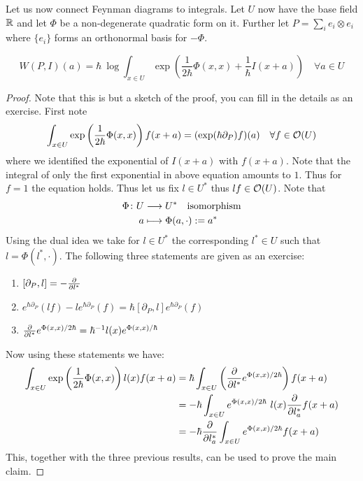 Let us now connect Feynman diagrams to integrals. Let $U$ now have the base field $\mathbb{R}$ and let $\Phi$ be a non-degenerate quadratic form on it. Further let $P = \sum_i e_i \otimes e_i$ where $\{e_i\}$ forms an orthonormal basis for $- \Phi$.

\begin{prop}
  $$ W(P,I)(a) = \hbar \ \log \int_{x \in U} \exp\left( \frac{1}{2\hbar} \Phi(x,x) + \frac{1}{\hbar} I(x+a) \right) \quad \forall a \in U $$
\begin{proof}
  Note that this is but a sketch of the proof, you can fill in the details as an exercise. First note
  $$ \int_{x \in U} \exp\left( \frac{1}{2\hbar} \Phi(x,x) \right) f(x+a) = (\exp(\hbar \partial_P) f) (a) \quad \forall f \in \mathcal{O}(U) $$
  where we identified the exponential of $I(x+a)$ with $f(x+a)$. Note that the integral of only the first exponential in above equation amounts to $1$. Thus for $f = 1$ the equation holds. Thus let us fix $l \in U^*$ thus $lf \in \mathcal{O}(U)$. Note that
  \begin{align*}
    \Phi \colon U &\longrightarrow U^* \quad \text{isomorphism}\\
    a &\longmapsto \Phi(a, \cdot) := a^*
  \end{align*}
  Using the dual idea we take for $l \in U^*$ the corresponding $l^* \in U$ such that $l = \Phi(l^*, \cdot)$. The following three statements are given as an exercise:
  \begin{enumerate}
    \item $[\partial_P, l] = - \frac{\partial }{\partial l^*}$
    \item $e^{\hbar \partial_P}(lf) - l e^{\hbar \partial_P} (f) = \hbar [\partial_P, l] e^{\hbar \partial_P}(f)$
    \item $\frac{\partial }{\partial l^*} e^{\Phi(x,x)/2\hbar} = \hbar^{-1} l(x) e^{\Phi(x,x)/\hbar}$
  \end{enumerate}
  Now using these statements we have:
  \begin{align*}
    \int_{x \in U} \exp\left( \frac{1}{2\hbar} \Phi(x,x) \right) l(x) f(x+a) &= \hbar \int_{x \in U} \left( \frac{\partial }{\partial l^*} e^{\Phi(x,x)/2\hbar} \right) f(x+a) \\
    &= - \hbar \int_{x \in U} e^{\Phi(x,x)/2\hbar} \ l(x) \frac{\partial }{\partial l_a^*} f(x+a) \\
    &= - \hbar \frac{\partial }{\partial l_a^*} \int_{x \in U} e^{\Phi(x,x)/2\hbar} f(x+a)
  \end{align*}
  This, together with the three previous results, can be used to prove the main claim.
\end{proof}
\end{prop}

